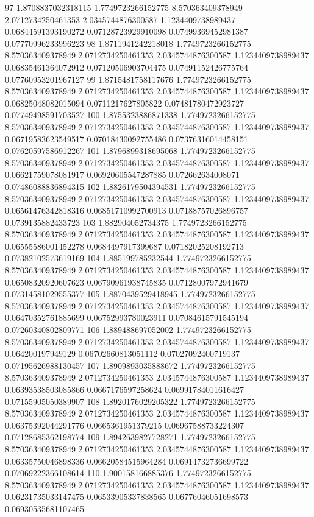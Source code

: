 {97 1.8708837032318115 1.7749723266152775 8.570363409378949 2.0712734250461353 2.0345744876300587 1.1234409738989437 0.06844591393190272 0.07128723929910098 0.07499369452981387 0.07770996233996223
98 1.8711941242218018 1.7749723266152775 8.570363409378949 2.0712734250461353 2.0345744876300587 1.1234409738989437 0.06835461364072912 0.07120506903704475 0.07491152426775764 0.07760953201967127
99 1.8715481758117676 1.7749723266152775 8.570363409378949 2.0712734250461353 2.0345744876300587 1.1234409738989437 0.06825048082015094 0.0711217627805822 0.07481780472923727 0.07749498591703527
100 1.8755323886871338 1.7749723266152775 8.570363409378949 2.0712734250461353 2.0345744876300587 1.1234409738989437 0.06719583623549517 0.07018430092755486 0.07376316014458151 0.07620597586912267
101 1.8796899318695068 1.7749723266152775 8.570363409378949 2.0712734250461353 2.0345744876300587 1.1234409738989437 0.06621759078081917 0.06920605547287885 0.072662634008071 0.07486088836894315
102 1.8826179504394531 1.7749723266152775 8.570363409378949 2.0712734250461353 2.0345744876300587 1.1234409738989437 0.06561476342818316 0.06851710992700913 0.07188757026896757 0.0739135882433723
103 1.882904052734375 1.7749723266152775 8.570363409378949 2.0712734250461353 2.0345744876300587 1.1234409738989437 0.06555586001452278 0.0684497917399687 0.07182025208192713 0.07382102573619169
104 1.885199785232544 1.7749723266152775 8.570363409378949 2.0712734250461353 2.0345744876300587 1.1234409738989437 0.06508320920607623 0.06790961938745835 0.07128007972941679 0.07314581029555377
105 1.8870439529418945 1.7749723266152775 8.570363409378949 2.0712734250461353 2.0345744876300587 1.1234409738989437 0.06470352761885699 0.06752993780023911 0.07084615791545194 0.07260340802809771
106 1.889488697052002 1.7749723266152775 8.570363409378949 2.0712734250461353 2.0345744876300587 1.1234409738989437 0.064200197949129 0.06702660813051112 0.07027092400719137 0.07195626988130457
107 1.8909893035888672 1.7749723266152775 8.570363409378949 2.0712734250461353 2.0345744876300587 1.1234409738989437 0.06393538503085866 0.0667176597258624 0.06991784011616427 0.07155905050389907
108 1.8920176029205322 1.7749723266152775 8.570363409378949 2.0712734250461353 2.0345744876300587 1.1234409738989437 0.06375392044291776 0.0665361951379215 0.06967588733224307 0.07128685362198774
109 1.8942639827728271 1.7749723266152775 8.570363409378949 2.0712734250461353 2.0345744876300587 1.1234409738989437 0.06335750046898336 0.06620584515964284 0.06914732736699722 0.07069222366108614
110 1.900158166885376 1.7749723266152775 8.570363409378949 2.0712734250461353 2.0345744876300587 1.1234409738989437 0.06231735033147475 0.06533905337838565 0.06776046051698573 0.06930535681107465
}
